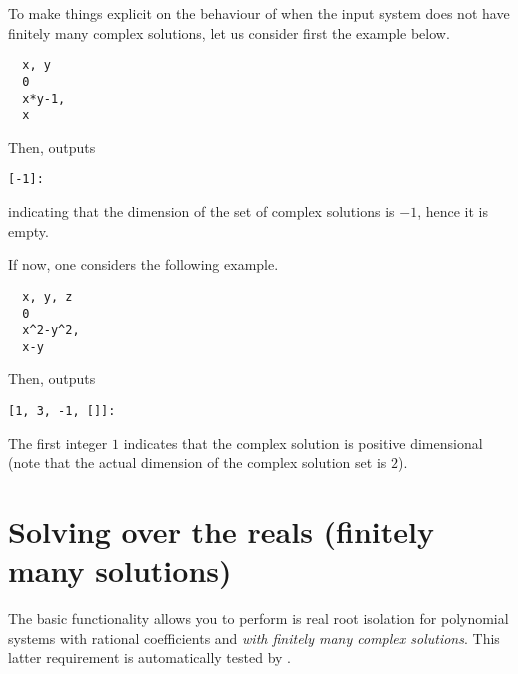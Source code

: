 \documentclass[a4paper,english,11pt]{scrartcl}
\theoremstyle{definition}
\theoremstyle{remark}
\begin{document}
To make things explicit on the behaviour of \msolve when the input system
does not have finitely many complex solutions, let us consider first the example
below.
\begin{tcolorbox}
\begin{verbatim}
  x, y
  0
  x*y-1,
  x
\end{verbatim}
\end{tcolorbox}
Then, \msolve outputs
\begin{tcolorbox}
\begin{verbatim}
[-1]:
\end{verbatim}
\end{tcolorbox}
indicating that the dimension of the set of complex solutions is $-1$, hence it
is empty.

If now, one considers the following example.
\begin{tcolorbox}
\begin{verbatim}
  x, y, z
  0
  x^2-y^2,
  x-y
\end{verbatim}
\end{tcolorbox}
Then, \msolve outputs
\begin{tcolorbox}
\begin{verbatim}
[1, 3, -1, []]:
\end{verbatim}
\end{tcolorbox}
The first integer $1$ indicates that the complex solution is positive
dimensional (note that the actual dimension of the complex solution set is $2$).


\section{Solving over the reals (finitely many solutions)}\label{sec:solvingreals}

The basic functionality \msolve allows you to perform is real root
isolation for polynomial systems with rational coefficients and {\em with
  finitely many complex solutions}. This latter requirement is automatically
tested by \msolve. 
\end{document}
